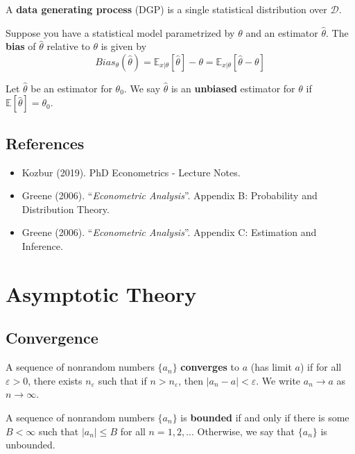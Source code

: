 \documentclass[12pt,]{book}
\providecommand{\tightlist}{%
  \setlength{\itemsep}{0pt}\setlength{\parskip}{0pt}}
\begin{document}
A \textbf{data generating process} (DGP) is a single statistical distribution over \(\mathcal{D}\).

Suppose you have a statistical model parametrized by \(\theta\) and an estimator \(\hat{\theta}\). The \textbf{bias} of \(\hat{\theta}\) relative to \(\theta\) is given by
\[
    Bias _ {\theta} (\hat{\theta}) = \mathbb{E} _ {x|\theta} [\hat{\theta} ] - \theta = \mathbb{E} _ {x|\theta} [\hat{\theta} - \theta]
\]

Let \(\hat{\theta}\) be an estimator for \(\theta_0\). We say \(\hat{\theta}\) is an \textbf{unbiased} estimator for \(\theta\) if \(\mathbb{E}[\hat{\theta}] = \theta_0\).

\hypertarget{references-2}{%
\section{References}\label{references-2}}

\begin{itemize}
\tightlist
\item
  Kozbur (2019). PhD Econometrics - Lecture Notes.
\item
  Greene (2006). ``\emph{Econometric Analysis}''. Appendix B: Probability and Distribution Theory.
\item
  Greene (2006). ``\emph{Econometric Analysis}''. Appendix C: Estimation and Inference.
\end{itemize}

\hypertarget{appendix3}{%
\chapter{Asymptotic Theory}\label{appendix3}}

\hypertarget{convergence}{%
\section{Convergence}\label{convergence}}

A sequence of nonrandom numbers \(\{ a_n \}\) \textbf{converges} to \(a\) (has limit \(a\)) if for all \(\varepsilon>0\), there exists \(n _ \varepsilon\) such that if \(n > n_ \varepsilon\), then \(|a_n - a| < \varepsilon\). We write \(a_n \to a\) as \(n \to \infty\).

A sequence of nonrandom numbers \(\{ a_n \}\) is \textbf{bounded} if and only if there is some \(B < \infty\) such that \(|a_n| \leq B\) for all \(n=1,2,...\) Otherwise, we say that \(\{a_n\}\) is unbounded.
\end{document}
